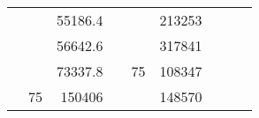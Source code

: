 \begin{table}[H]
\begin{tabular}{|ccrccrccc}
\multicolumn{1}{|c|}{\cellcolor[HTML]{FFFFC7}}                                & \multicolumn{1}{c|}{\cellcolor[HTML]{DAE8FC}}                      & \multicolumn{1}{r|}{\cellcolor[HTML]{DAE8FC}55186.4}   & \multicolumn{1}{c|}{\cellcolor[HTML]{FFFFC7}}                                & \multicolumn{1}{c|}{\cellcolor[HTML]{DAE8FC}}                       & \multicolumn{1}{r|}{\cellcolor[HTML]{DDFDFF}213253}    &                                                                              &                                                                    &                                                        \\ \cline{3-3} \cline{6-6}
\multicolumn{1}{|c|}{\cellcolor[HTML]{FFFFC7}}                                & \multicolumn{1}{c|}{\cellcolor[HTML]{DAE8FC}}                      & \multicolumn{1}{r|}{\cellcolor[HTML]{DDFDFF}56642.6}   & \multicolumn{1}{c|}{\cellcolor[HTML]{FFFFC7}}                                & \multicolumn{1}{c|}{\cellcolor[HTML]{DAE8FC}}                       & \multicolumn{1}{r|}{\cellcolor[HTML]{DAE8FC}317841}    &                                                                              &                                                                    &                                                        \\ \cline{3-3} \cline{6-6}
\multicolumn{1}{|c|}{\cellcolor[HTML]{FFFFC7}}                                & \multicolumn{1}{c|}{\cellcolor[HTML]{DAE8FC}}                      & \multicolumn{1}{r|}{\cellcolor[HTML]{DAE8FC}73337.8}   & \multicolumn{1}{c|}{\cellcolor[HTML]{FFFFC7}}                                & \multicolumn{1}{c|}{\multirow{-10}{*}{\cellcolor[HTML]{DAE8FC}75}}  & \multicolumn{1}{r|}{\cellcolor[HTML]{DDFDFF}108347}    &                                                                              &                                                                    &                                                        \\ \cline{3-3} \cline{5-6}
\multicolumn{1}{|c|}{\cellcolor[HTML]{FFFFC7}}                                & \multicolumn{1}{c|}{\multirow{-10}{*}{\cellcolor[HTML]{DAE8FC}75}} & \multicolumn{1}{r|}{\cellcolor[HTML]{DDFDFF}150406}    & \multicolumn{1}{c|}{\cellcolor[HTML]{FFFFC7}}                                & \multicolumn{1}{c|}{\cellcolor[HTML]{DDFDFF}}                       & \multicolumn{1}{r|}{\cellcolor[HTML]{DAE8FC}148570}    &                                                                              &                                                                    &                                                        \\ \cline{2-3} \cline{6-6}

\end{tabular}
\end{table}
